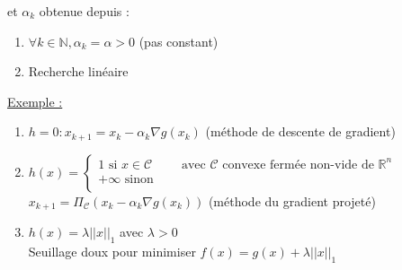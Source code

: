 \documentclass[12pt,a4paper]{article}
\begin{document}
et $\alpha_k$ obtenue depuis :
\begin{enumerate}[label=\roman*)]
    \item $\forall k \in \mathbb{N}, \alpha_k = \alpha > 0$ (pas constant)
    \item Recherche linéaire
\end{enumerate}

\noindent\underline{Exemple :}
\begin{enumerate}[label=\roman*)]
    \item $h = 0 : x_{k+1} = x_k - \alpha_k \nabla g(x_k)$ (méthode de descente de gradient)
    \item $h(x) = \begin{cases}
        1 \text{ si } x \in \mathcal{C} \qquad \text{ avec } \mathcal{C} \text{ convexe fermée non-vide de } \mathbb{R}^n\\
        + \infty \text{ sinon}\\
    \end{cases}$
    $x_{k+1} = \Pi_{\mathcal{C}}(x_k - \alpha_k \nabla g(x_k))$ (méthode du gradient projeté)
    \item $h(x) = \lambda ||x||_1$ avec $\lambda > 0$\\
    Seuillage doux pour minimiser $f(x) = g(x) + \lambda ||x||_1$\\
\end{enumerate}
\end{document}
